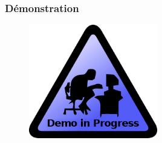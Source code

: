  \begin{frame}
   \frametitle{Démonstration}
   \begin{figure}
   \includegraphics[width=0.5\textwidth]{Fig/demoInProgress.png}
   \end{figure}

 \end{frame}